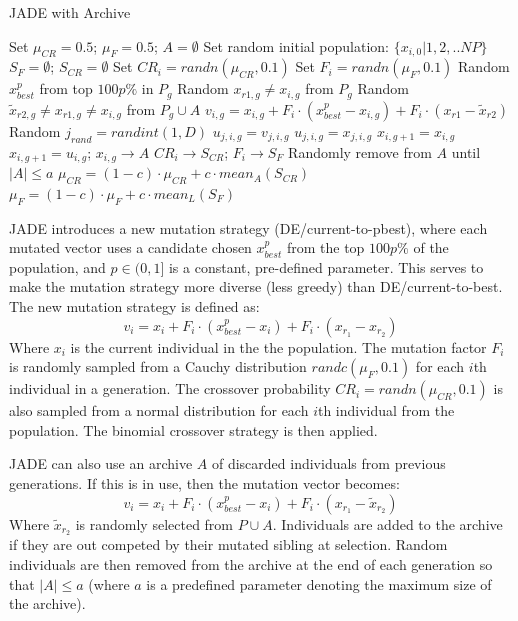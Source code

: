 \documentclass[10pt,a4paper, oneside, conference]{IEEEtran}
\begin{document}
	\begin{algorithm}[h]
  \caption{JADE with Archive}\label{algorithm:JADEwArchive}
  \begin{algorithmic}[1]
    \State Set $\mu_{CR}=0.5$; $\mu_{F}=0.5$; $A=\emptyset$
    \State Set random initial population: $ \{x_{i,0}|1,2,..NP \}$
    \State $S_F=\emptyset$; $S_{CR}=\emptyset$
    \State Set $CR_i=randn(\mu_{CR},0.1)$
    \State Set $F_i=randn(\mu_{F},0.1)$
    \State Random $x_{best}^p$ from top $100p\%$ in $P_g$
    \State Random $x_{r1,g} \neq x_{i,g}$ from $P_g$
    \State Random $\widetilde{x}_{r2,g} \neq x_{r1,g} \neq x_{i,g}$ from $P_g \cup A$
	\State $v_{i,g}=x_{i,g} + F_i \cdot (x^p_{best}-x_{i,g})+ F_i \cdot (x_{r1}-\widetilde{x}_{r2})$
	\State Random $j_{rand}=randint(1,D)$
	\State $u_{j,i,g} = v_{j,i,g}$
	\Else
	\State $u_{j,i,g} = x_{j,i,g}$
	\EndIf
	\EndFor
	\State $x_{i,g+1}=x_{i,g}$
	\Else
	\State $x_{i,g+1}=u_{i,g}$; $x_{i,g} \rightarrow A$
	\State $CR_i \rightarrow S_{CR}$; $F_i \rightarrow S_F$
	\EndIf
    \EndFor
    \State Randomly remove from $A$ until $|A| \leq a$
    \State $\mu_{CR}=(1-c) \cdot \mu_{CR} + c \cdot mean_A(S_{CR})$
    \State $\mu_F=(1-c) \cdot \mu_F + c \cdot mean_L(S_F)$
    \EndFor
    \EndProcedure
  \end{algorithmic}
\end{algorithm}

	JADE introduces a new mutation strategy (DE/current-to-pbest), where each mutated vector uses a candidate chosen $x^p_{best}$ from the top $100p\%$ of the population, and $p\in (0,1]$ is a constant, pre-defined parameter.
	This serves to make the mutation strategy more diverse (less greedy) than DE/current-to-best.
	The new mutation strategy is defined as:
	\begin{equation}
	\label{equation:JADEMutation}
	v_i=x_i + F_i \cdot (x^p_{best}-x_i)+ F_i \cdot (x_{r_1}-x_{r_2})
	\end{equation}
	Where $x_i$ is the current individual in the the population. The mutation factor $F_i$ is randomly sampled from a Cauchy distribution $randc(\mu_F,0.1)$ for each $i$th individual in a generation.
	The crossover probability $CR_i=randn(\mu_{CR},0.1)$ is also sampled from a normal distribution for each $i$th individual from the population.
	The binomial crossover strategy is then applied.
	
	JADE can also use an archive $A$ of discarded individuals from previous generations.
	If this is in use, then the mutation vector becomes:
	\begin{equation}
	\label{equation:JADEMutationArchive}
	v_i=x_i + F_i \cdot (x^p_{best}-x_i)+ F_i \cdot (x_{r_1}-\widetilde{x}_{r_2})
	\end{equation}
	Where $\widetilde{x}_{r_2}$ is randomly selected from $P \cup A$.
	Individuals are added to the archive if they are out competed by their mutated sibling at selection.
	Random individuals are then removed from the archive at the end of each generation so that $|A| \leq a$ (where $a$ is a predefined parameter denoting the maximum size of the archive).
	
\end{document}
